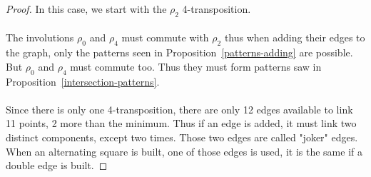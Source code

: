 \begin{proof}
  In this case, we start with the $\rho_2$ 4-transposition.

  \begin{figure}[H]
    \begin{center}
      \caption{}
    \end{center}
  \end{figure}

\paragraph{}
The involutions $\rho_0$ and $\rho_4$ must commute with $\rho_2$ thus when adding their edges to the graph, only the patterns seen in Proposition~\ref{patterns-adding} are possible. But $\rho_0$ and $\rho_4$ must commute too. Thus they must form patterns saw in Proposition~\ref{intersection-patterns}.

\paragraph{}
Since there is only one 4-transposition, there are only 12 edges available to link 11 points, 2 more than the minimum. Thus if an edge is added, it must link two distinct components, except two times. Those two edges are called "joker" edges. When an alternating square is built, one of those edges is used, it is the same if a double edge is built.


\end{proof}

